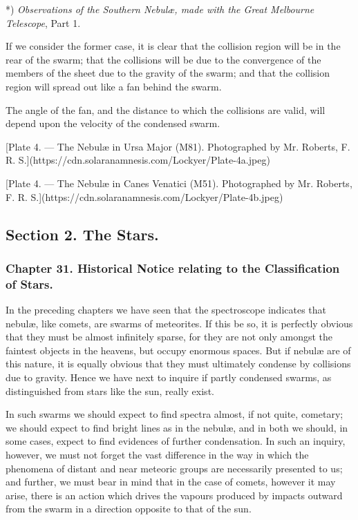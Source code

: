 \documentclass[a4paper, 12pt, oneside, polutonikogreek, english]{article}
\begin{document}
*) \emph{Observations of the Southern Nebulæ, made with the Great Melbourne Telescope}, Part 1.

If we consider the former case, it is clear that the collision region will be in the rear of the swarm; that the collisions will be due to the convergence of the members of the sheet due to the gravity of the swarm; and that the collision region will spread out like a fan behind the swarm.

The angle of the fan, and the distance to which the collisions are valid, will depend upon the velocity of the condensed swarm.

[Plate 4. --- The Nebulæ in Ursa Major (M81). Photographed by Mr. Roberts, F. R. S.](https://cdn.solaranamnesis.com/Lockyer/Plate-4a.jpeg)

[Plate 4. --- The Nebulæ in Canes Venatici (M51). Photographed by Mr. Roberts, F. R. S.](https://cdn.solaranamnesis.com/Lockyer/Plate-4b.jpeg)

\subsection{Section 2. The Stars.}

\subsubsection{Chapter 31. Historical Notice relating to the Classification of Stars.}

In the preceding chapters we have seen that the spectroscope indicates that nebulæ, like comets, are swarms of meteorites. If this be so, it is perfectly obvious that they must be almost infinitely sparse, for they are not only amongst the faintest objects in the heavens, but occupy enormous spaces. But if nebulæ are of this nature, it is equally obvious that they must ultimately condense by collisions due to gravity. Hence we have next to inquire if partly condensed swarms, as distinguished from stars like the sun, really exist.

In such swarms we should expect to find spectra almost, if not quite, cometary; we should expect to find bright lines as in the nebulæ, and in both we should, in some cases, expect to find evidences of further condensation. In such an inquiry, however, we must not forget the vast difference in the way in which the phenomena of distant and near meteoric groups are necessarily presented to us; and further, we must bear in mind that in the case of comets, however it may arise, there is an action which drives the vapours produced by impacts outward from the swarm in a direction opposite to that of the sun.
\end{document}
